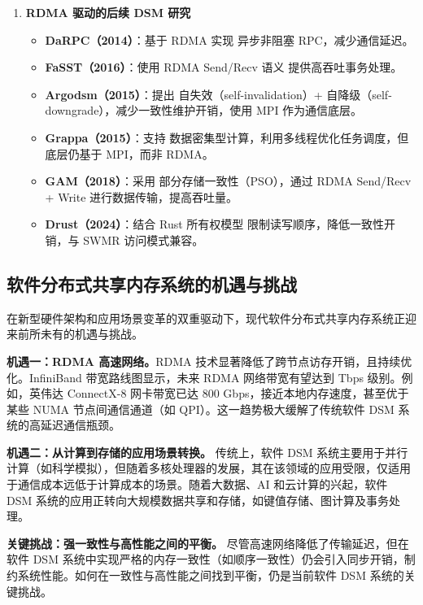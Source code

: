 {\begin{enumerate}[leftmargin=1em, align=left]
    \item \textbf{RDMA 驱动的后续 DSM 研究}

          \begin{itemize}
            \item \textbf{DaRPC（2014）}：基于 RDMA 实现 异步非阻塞 RPC，减少通信延迟。
            \item \textbf{FaSST（2016）}：使用 RDMA Send/Recv 语义 提供高吞吐事务处理。
            \item \textbf{Argodsm（2015）}：提出 自失效（self-invalidation）+ 自降级（self-downgrade），减少一致性维护开销，使用 MPI 作为通信底层。
            \item \textbf{Grappa（2015）}：支持 数据密集型计算，利用多线程优化任务调度，但底层仍基于 MPI，而非 RDMA。
            \item \textbf{GAM（2018）}：采用 部分存储一致性（PSO），通过 RDMA Send/Recv + Write 进行数据传输，提高吞吐量。
            \item \textbf{Drust（2024）}：结合 Rust 所有权模型 限制读写顺序，降低一致性开销，与 SWMR 访问模式兼容。
          \end{itemize}

  \end{enumerate}

  \subsection{软件分布式共享内存系统的机遇与挑战}
  在新型硬件架构和应用场景变革的双重驱动下，现代软件分布式共享内存系统正迎来前所未有的机遇与挑战。

  \textbf{机遇一：RDMA 高速网络。}RDMA 技术显著降低了跨节点访存开销，且持续优化。InfiniBand 带宽路线图显示，未来 RDMA 网络带宽有望达到 Tbps 级别。例如，英伟达 ConnectX-8 网卡带宽已达 800 Gbps，接近本地内存速度，甚至优于某些 NUMA 节点间通信通道（如 QPI）。这一趋势极大缓解了传统软件 DSM 系统的高延迟通信瓶颈。

  \textbf{机遇二：从计算到存储的应用场景转换。} 传统上，软件 DSM 系统主要用于并行计算（如科学模拟），但随着多核处理器的发展，其在该领域的应用受限，仅适用于通信成本远低于计算成本的场景。随着大数据、AI 和云计算的兴起，软件 DSM 系统的应用正转向大规模数据共享和存储，如键值存储、图计算及事务处理。

  \textbf{关键挑战：强一致性与高性能之间的平衡。} 尽管高速网络降低了传输延迟，但在软件 DSM 系统中实现严格的内存一致性（如顺序一致性）仍会引入同步开销，制约系统性能。如何在一致性与高性能之间找到平衡，仍是当前软件 DSM 系统的关键挑战。

}
